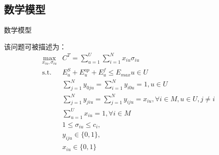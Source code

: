 \documentclass{ctexbeamer}
\begin{document}
\subsection{数学模型}
\begin{frame}{数学模型}
    \scriptsize

    该问题可被描述为：
    \begin{align}
        \mathop{\max}_{x_{iu},\sigma_{iu}} & C^T = \sum_{u=1}^U \sum_{i=1}^N x_{iu} \sigma_{iu}                              \\
        \mathrm{s.t.}                      & E_u^S+E_u^{ap}+E_u^f \leq E_{max} u \in U                                       \\
                                           & \sum_{j=1}^Ny_{0ju}=\sum_{i=1}^Ny_{i0u}=1,u \in U                               \\
                                           & \sum_{j=1}^Ny_{jiu}=\sum_{j=1}^Ny_{iju}=x_{iu},\forall{i \in M,u\in U,j \neq i} \\
                                           & \sum_{u=1}^Ux_{iu}=1,\forall{i \in M}                                           \\
                                           & 1\leq \sigma_{iu} \leq c_i,                                                     \\
                                           & y_{iju}\in \lbrace0,1\rbrace,                                                   \\
                                           & x_{iu}\in \lbrace0,1\rbrace
    \end{align}

\end{frame}
\end{document}
